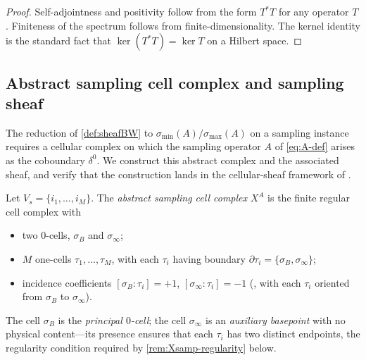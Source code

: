 \begin{proof}
Self-adjointness and positivity follow from the form
$T^* T$ for any operator $T$. Finiteness of the spectrum follows
from finite-dimensionality. The kernel identity is the standard
fact that $\ker(T^* T) = \ker T$ on a Hilbert space.
\end{proof}

\subsection{Abstract sampling cell complex and sampling sheaf}\label{subsec:sheafBW-Xsamp}

The reduction of \cref{def:sheafBW} to
$\sigma_{\min}(A)/\sigma_{\max}(A)$ on a sampling instance requires
a cellular complex on which the sampling operator $A$ of
\cref{eq:A-def} arises as the coboundary $\delta^0$. We construct
this abstract complex and the associated sheaf, and verify that the
construction lands in the cellular-sheaf framework of
\cite{HansenGhrist2019,Robinson2014}.

\begin{definition}\label{def:Xsamp}
Let $V_s = \{i_1, \ldots, i_M\}$. The \emph{abstract sampling cell
complex} $X^A$ is the finite regular cell complex with
\begin{itemize}[leftmargin=2em]
  \item two $0$-cells, $\sigma_B$ and $\sigma_\infty$;
  \item $M$ one-cells $\tau_1, \ldots, \tau_M$, with each $\tau_i$
        having boundary $\partial \tau_i = \{\sigma_B, \sigma_\infty\}$;
  \item incidence coefficients
        $[\sigma_B : \tau_i] = +1$, $[\sigma_\infty : \tau_i] = -1$
        (\cite[\S 2.1]{Hatcher2002}, with each $\tau_i$ oriented
        from $\sigma_B$ to $\sigma_\infty$).
\end{itemize}
The cell $\sigma_B$ is the \emph{principal $0$-cell}; the cell
$\sigma_\infty$ is an \emph{auxiliary basepoint} with no physical
content---its presence ensures that each $\tau_i$ has two distinct
endpoints, the regularity condition required by
\cref{rem:Xsamp-regularity} below.
\end{definition}

